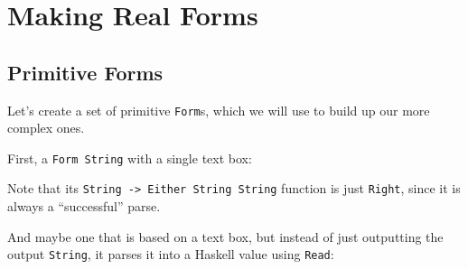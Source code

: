 \documentclass[]{article}
\newenvironment{Shaded}{}{}
\newcommand{\CommentTok}[1]{\textcolor[rgb]{0.38,0.63,0.69}{\textit{#1}}}
\newcommand{\DataTypeTok}[1]{\textcolor[rgb]{0.56,0.13,0.00}{#1}}
\newcommand{\FunctionTok}[1]{\textcolor[rgb]{0.02,0.16,0.49}{#1}}
\newcommand{\NormalTok}[1]{#1}
\newcommand{\OtherTok}[1]{\textcolor[rgb]{0.00,0.44,0.13}{#1}}
\begin{document}
\hypertarget{making-real-forms}{%
\section{Making Real Forms}\label{making-real-forms}}

\hypertarget{primitive-forms}{%
\subsection{Primitive Forms}\label{primitive-forms}}

Let's create a set of primitive \texttt{Form}s, which we will use to build up
our more complex ones.

First, a \texttt{Form\ String} with a single text box:

\begin{Shaded}
\end{Shaded}

Note that its \texttt{String\ -\textgreater{}\ Either\ String\ String} function
is just \texttt{Right}, since it is always a ``successful'' parse.

And maybe one that is based on a text box, but instead of just outputting the
output \texttt{String}, it parses it into a Haskell value using \texttt{Read}:
\end{document}
